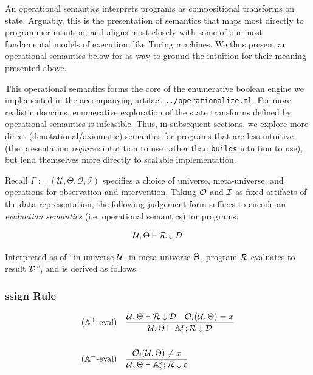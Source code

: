 \documentclass{article}
\begin{document}
An operational semantics interprets programs as compositional transforms on state. Arguably, this is the presentation of semantics that maps most directly to programmer intuition, and aligns most closely with some of our most fundamental models of execution; like Turing machines. We thus present an operational semantics below for \AIM as way to ground the intuition for their meaning presented above.

This operational semantics forms the core of the enumerative boolean engine we implemented in the accompanying artifact \texttt{../operationalize.ml}. For more realistic domains, enumerative exploration of the state transforms defined by operational semantics is infeasible. Thus, in subsequent sections, we explore more direct (denotational/axiomatic) semantics for \AIM programs that are less intuitive (the presentation \textit{requires} intutition to use rather than \texttt{builds} intuition to use), but lend themselves more directly to scalable implementation.



Recall $\Gamma := (\mathcal{U}, \Theta, \mathcal{O}, \mathcal{I})$ specifies a choice of universe, meta-universe, and operations for observation and intervention. Taking $\mathcal{O}$ and $\mathcal{I}$ as fixed artifacts of the data representation, the following judgement form suffices to encode an \textit{evaluation semantics} (i.e. operational semantics) for \AIM programs:

\newcommand{\dto}{\downarrow}

\begin{equation*}
  \U, \MU \vdash \R \dto \D
\end{equation*}

Interpreted as of ``in universe $\mathcal{U}$, in meta-universe $\Theta$, \AIM program $\mathcal{R}$ evaluates to result $\mathcal{D}$'', and is derived as follows:

\subsubsection{\A ssign Rule}

\begin{align*}
  (\A^+\text{-eval}) &\quad \frac{\U, \MU \vdash \R \dto \D \quad \mathcal{O}_i(\U, \MU) = x}{\U, \MU \vdash \A^{x}_{i} ; \R \dto \D} \\[1.5em]
  (\A^-\text{-eval}) &\quad \frac{\mathcal{O}_i(\U, \MU) \ne x}{\U, \MU \vdash \A^{x}_{i} ; \R \dto \epsilon}
\end{align*}
\end{document}
